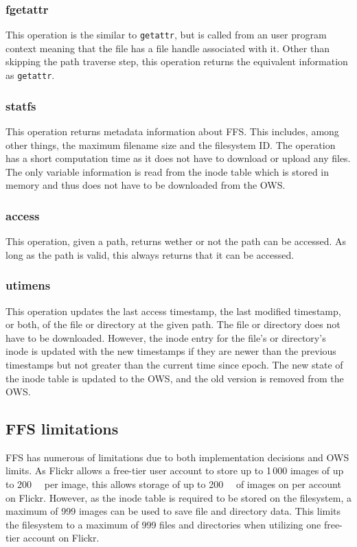 \subsubsection{fgetattr}
This operation is the similar to \texttt{getattr}, but is called from an user program context meaning that the file has a file handle associated with it. Other than skipping the path traverse step, this operation returns the equivalent information as \texttt{getattr}.

\subsubsection{statfs}
This operation returns metadata information about FFS. This includes, among other things, the maximum filename size and the filesystem ID. The operation has a short computation time as it does not have to download or upload any files. The only variable information is read from the inode table which is stored in memory and thus does not have to be downloaded from the OWS.

\subsubsection{access}
This operation, given a path, returns wether or not the path can be accessed. As long as the path is valid, this always returns that it can be accessed.

\subsubsection{utimens}
This operation updates the last access timestamp, the last modified timestamp, or both, of the file or directory at the given path. The file or directory does not have to be downloaded. However, the inode entry for the file's or directory's inode is updated with the new timestamps if they are newer than the previous timestamps but not greater than the current time since epoch. The new state of the inode table is updated to the OWS, and the old version is removed from the OWS.


\subsection{FFS limitations}
\label{subsec:ffs_limits}
FFS has numerous of limitations due to both implementation decisions and OWS limits. As Flickr allows a free-tier user account to store up to 1\,000 images of up to \SI{200}{\mega\byte} per image, this allows storage of up to \SI{200}{\giga\byte} of images on per account on Flickr. However, as the inode table is required to be stored on the filesystem, a maximum of 999 images can be used to save file and directory data. This limits the filesystem to a maximum of 999 files and directories when utilizing one free-tier account on Flickr. 

